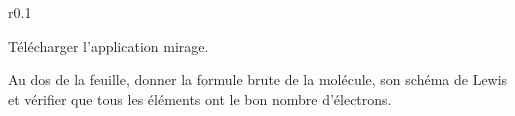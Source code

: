 \begin{wrapfigure}{r}{0.1\linewidth}
  \vspace*{-18pt}
\end{wrapfigure}

\telechargement Télécharger l'application mirage.

\mesure Au dos de la feuille, donner la formule brute de la molécule, son schéma de Lewis et vérifier que tous les éléments ont le bon nombre d'électrons.
